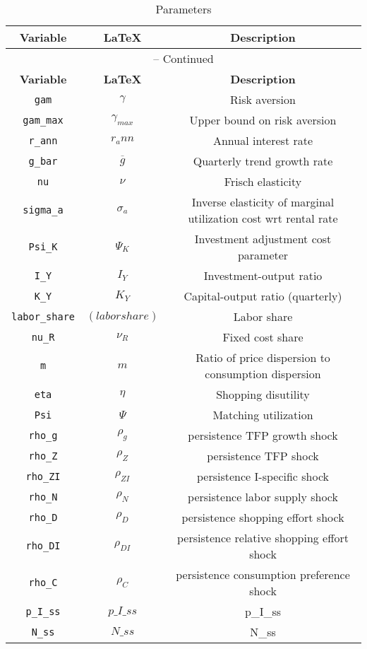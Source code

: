 \begin{center}
\begin{longtable}{ccc}
\caption{Parameters}\\%
\hline%
\multicolumn{1}{c}{\textbf{Variable}} &
\multicolumn{1}{c}{\textbf{\LaTeX}} &
\multicolumn{1}{c}{\textbf{Description}}\\%
\hline\hline%
\endfirsthead
\multicolumn{3}{c}{{\tablename} \thetable{} -- Continued}\\%
\hline%
\multicolumn{1}{c}{\textbf{Variable}} &
\multicolumn{1}{c}{\textbf{\LaTeX}} &
\multicolumn{1}{c}{\textbf{Description}}\\%
\hline\hline%
\endhead
\texttt{gam} & ${\gamma}$ & Risk aversion\\
\texttt{gam\_max} & ${\gamma_{max}}$ & Upper bound on risk aversion\\
\texttt{r\_ann} & ${r_ann}$ & Annual interest rate\\
\texttt{g\_bar} & ${\overline{g}}$ & Quarterly trend growth rate\\
\texttt{nu} & $\nu$ & Frisch elasticity\\
\texttt{sigma\_a} & ${\sigma_a}$ & Inverse elasticity of marginal utilization cost wrt rental rate\\
\texttt{Psi\_K} & ${\Psi_K}$ & Investment adjustment cost parameter\\
\texttt{I\_Y} & ${I_Y}$ & Investment-output ratio\\
\texttt{K\_Y} & ${K_Y}$ & Capital-output ratio (quarterly)\\
\texttt{labor\_share} & $(labor share)$ & Labor share\\
\texttt{nu\_R} & ${\nu_R}$ & Fixed cost share\\
\texttt{m} & ${m}$ & Ratio of price dispersion to consumption dispersion\\
\texttt{eta} & ${\eta}$ & Shopping disutility\\
\texttt{Psi} & ${\Psi}$ & Matching utilization\\
\texttt{rho\_g} & ${\rho_g}$ & persistence TFP growth shock\\
\texttt{rho\_Z} & ${\rho_Z}$ & persistence TFP shock\\
\texttt{rho\_ZI} & ${\rho_{ZI}}$ & persistence I-specific shock\\
\texttt{rho\_N} & ${\rho_N}$ & persistence labor supply shock\\
\texttt{rho\_D} & ${\rho_D}$ & persistence shopping effort shock\\
\texttt{rho\_DI} & ${\rho_{DI}}$ & persistence relative shopping effort shock\\
\texttt{rho\_C} & ${\rho_C}$ & persistence consumption preference shock\\
\texttt{p\_I\_ss} & $p\_I\_ss$ & p\_I\_ss\\
\texttt{N\_ss} & $N\_ss$ & N\_ss\\
\hline%
\end{longtable}
\end{center}
